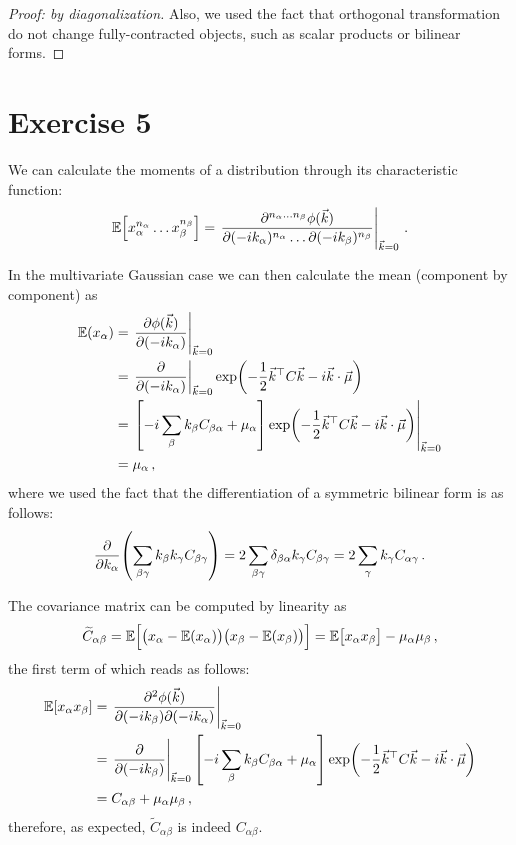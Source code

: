 \documentclass[main.tex]{subfiles}
\begin{document}
\begin{proof}[Proof: by diagonalization]
Also, we used the fact that orthogonal transformation do not change fully-contracted objects, such as scalar products or bilinear forms.
\end{proof}

\section{Exercise 5}

We can calculate the moments of a distribution through its characteristic function: 
%
\begin{align}
\mathbb{E} \qty[x_\alpha^{n_\alpha } \dots x_\beta^{n_\beta }]
= \eval{\frac{\partial^{n_\alpha \dots n_\beta } \phi (\vec{k})}{\partial(- i k_\alpha )^{n_\alpha } \dots \partial(-i k_\beta )^{n_\beta }}}_{\vec{k} = 0}
\,.
\end{align}

In the multivariate Gaussian case we can then calculate the mean (component by component) as 
%
\begin{align}
\mathbb{E}(x_\alpha ) &= \eval{\pdv{\phi (\vec{k})}{(-i k_\alpha )}}_{\vec{k} = 0}  \\
&= \eval{\pdv{}{(-i k_\alpha )}}_{\vec{k} = 0}
\exp(- \frac{1}{2} \vec{k}^{\top} C \vec{k} - i \vec{k} \cdot \vec{\mu })  \\
&= \eval{\qty[- i \sum_\beta  k_\beta  C_{\beta  \alpha } + \mu _\alpha ] \exp(- \frac{1}{2} \vec{k}^{\top} C \vec{k} - i \vec{k} \cdot \vec{\mu })}_{\vec{k} = 0}  \\
&= \mu _\alpha 
\,,
\end{align}
%
where we used the fact that the differentiation of a symmetric bilinear form is as follows: 
%
\begin{align}
\pdv{}{k_\alpha } \qty(\sum _{\beta \gamma } k_\beta k_\gamma C_{\beta \gamma }) = 2 \sum _{\beta \gamma } \delta_{\beta \alpha } k_\gamma C_{\beta \gamma } = 2 \sum_{\gamma } k_\gamma C_{\alpha \gamma }
\,.
\end{align}

The covariance matrix can be computed by linearity as
%
\begin{align}
\widetilde{C}_{\alpha \beta } = \mathbb{E}\qty[\qty(x_ \alpha - \mathbb{E}(x_\alpha )) \qty(x_\beta - \mathbb{E}(x_\beta ))] 
= \mathbb{E}\qty[x_\alpha  x_\beta ] - \mu _\alpha \mu _\beta 
\,,
\end{align}
%
the first term of which reads as follows: 
%
\begin{align}
\mathbb{E}[x_\alpha x_\beta ] &= \eval{\pdv[2]{\phi (\vec{k})}{(-i k_\beta  )}{(-i k_\alpha  )}}_{\vec{k} = 0}  \\
&= \eval{\pdv{}{(-i k_\beta )}}_{\vec{k} = 0} \qty[-i \sum _{\beta } k_\beta C_{\beta \alpha } + \mu _\alpha ] \exp(- \frac{1}{2} \vec{k}^{\top} C \vec{k} - i \vec{k} \cdot \vec{\mu })  \\
&= C_{\alpha \beta } + \mu _\alpha \mu _\beta 
\,,
\end{align}
%
therefore, as expected, \(\widetilde{C}_{\alpha \beta }\) is indeed \(C_{\alpha \beta }\). 
\end{document}
